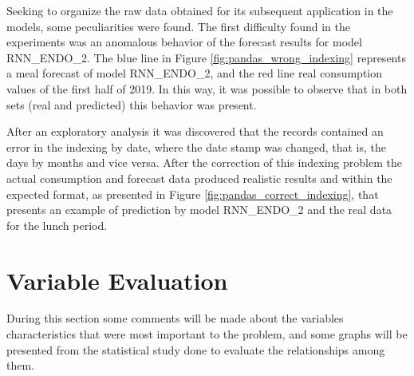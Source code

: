     Seeking to organize the raw data obtained for its subsequent application in the models, some peculiarities were found. The first difficulty found in the experiments was an anomalous behavior of the forecast results for model RNN\_ENDO\_2. The blue line in Figure \ref{fig:pandas_wrong_indexing} represents a meal forecast of model  RNN\_ENDO\_2, and the red line real consumption values of the first half of 2019. In this way, it was possible to observe that in both sets (real and predicted) this behavior was present. 
    
    \begin{figure}[!htpb]
    \end{figure}
    
    After an exploratory analysis it was discovered that the records contained an error in the indexing by date, where the date stamp was changed, that is, the days by months and vice versa. After the correction of this indexing problem the actual consumption and forecast data produced realistic results and within the expected format, as presented in Figure \ref{fig:pandas_correct_indexing},  that presents an example of prediction by model RNN\_ENDO\_2 and the real data for the lunch period.
    \begin{figure}[!htpb]
    \end{figure}
              
\section{Variable Evaluation}
During this section some comments will be made about the variables characteristics that were most important to the problem, and some graphs will be presented from the statistical study done to evaluate the relationships among them. 

